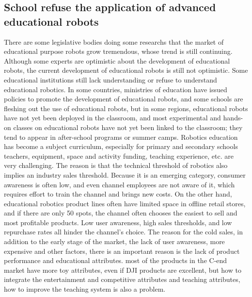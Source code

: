 \documentclass[a4paper,11pt]{article}
\begin{document}
\subsection{School refuse the application of advanced educational robots}
There are some legislative bodies doing some researchs that the market of  educational purpose robots grow tremendous, whose trend is still continuing\cite{blikstein2013digital}. Although some experts are optimistic about the development of educational robots, the current development of educational robots is still not optimistic. Some educational institutions still lack understanding or refuse to understand educational robotics. In some countries, ministries of education have issued policies to promote the development of educational robots\cite{benitti2012exploring}, and some schools are fleshing out the use of educational robots, but in some regions, educational robots have not yet been deployed in the classroom, and most experimental and hands-on classes on educational robots have not yet been linked to the classroom; they tend to appear in after-school programs or summer camps. Robotics education has become a subject curriculum, especially for primary and secondary schools teachers, equipment, space and activity funding, teaching experience, etc. are very challenging. The reason is that the technical threshold of robotics also implies an industry sales threshold. Because it is an emerging category, consumer awareness is often low, and even channel employees are not aware of it, which requires effort to train the channel and brings new costs. On the other hand, educational robotics product lines often have limited space in offline retail stores, and if there are only 50 spots, the channel often chooses the easiest to sell and most profitable products. Low user awareness, high sales thresholds, and low repurchase rates all hinder the channel's choice. The reason for the cold sales, in addition to the early stage of the market, the lack of user awareness, more expensive and other factors, there is an important reason is the lack of product performance and educational attributes. most of the products in the C-end market have more toy attributes, even if DJI products are excellent, but how to integrate the entertainment and competitive attributes and teaching attributes, how to improve the teaching system is also a problem.
\end{document}

